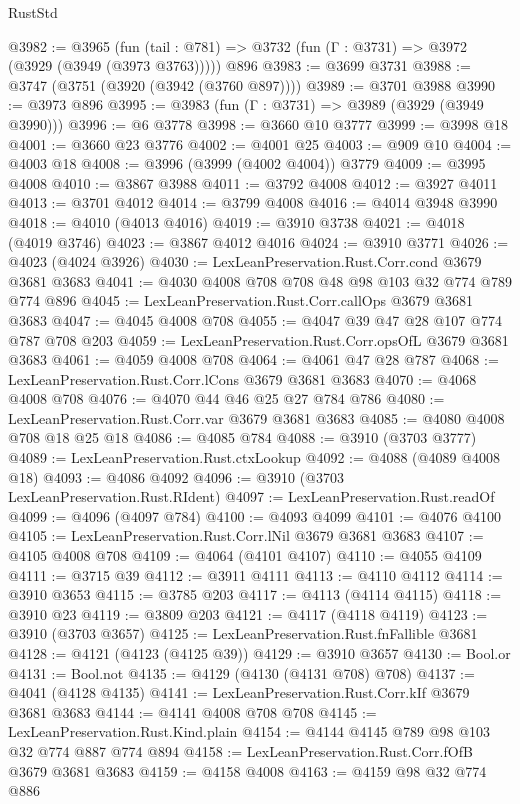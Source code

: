 \begin{lexlean}{RustStd}
\begin{coremodule}
{\begin{coremodule}
{{{{{{{{{{{{{{@3982 := @3965
    (fun (tail : @781) => @3732 (fun (Γ : @3731) => @3972 (@3929 (@3949 (@3973 @3763)))))
    @896
@3983 := @3699 @3731
@3988 := @3747 (@3751 (@3920 (@3942 (@3760 @897))))
@3989 := @3701 @3988
@3990 := @3973 @896
@3995 := @3983 (fun (Γ : @3731) => @3989 (@3929 (@3949 @3990)))
@3996 := @6 @3778
@3998 := @3660 @10 @3777
@3999 := @3998 @18
@4001 := @3660 @23 @3776
@4002 := @4001 @25
@4003 := @909 @10
@4004 := @4003 @18
@4008 := @3996 (@3999 (@4002 @4004)) @3779
@4009 := @3995 @4008
@4010 := @3867 @3988
@4011 := @3792 @4008
@4012 := @3927 @4011
@4013 := @3701 @4012
@4014 := @3799 @4008
@4016 := @4014 @3948 @3990
@4018 := @4010 (@4013 @4016)
@4019 := @3910 @3738
@4021 := @4018 (@4019 @3746)
@4023 := @3867 @4012 @4016
@4024 := @3910 @3771
@4026 := @4023 (@4024 @3926)
@4030 := LexLeanPreservation.Rust.Corr.cond @3679 @3681 @3683
@4041 := @4030 @4008 @708 @708 @48 @98 @103 @32 @774 @789 @774 @896
@4045 := LexLeanPreservation.Rust.Corr.callOps @3679 @3681 @3683
@4047 := @4045 @4008 @708
@4055 := @4047 @39 @47 @28 @107 @774 @787 @708 @203
@4059 := LexLeanPreservation.Rust.Corr.opsOfL @3679 @3681 @3683
@4061 := @4059 @4008 @708
@4064 := @4061 @47 @28 @787
@4068 := LexLeanPreservation.Rust.Corr.lCons @3679 @3681 @3683
@4070 := @4068 @4008 @708
@4076 := @4070 @44 @46 @25 @27 @784 @786
@4080 := LexLeanPreservation.Rust.Corr.var @3679 @3681 @3683
@4085 := @4080 @4008 @708 @18 @25 @18
@4086 := @4085 @784
@4088 := @3910 (@3703 @3777)
@4089 := LexLeanPreservation.Rust.ctxLookup
@4092 := @4088 (@4089 @4008 @18)
@4093 := @4086 @4092
@4096 := @3910 (@3703 LexLeanPreservation.Rust.RIdent)
@4097 := LexLeanPreservation.Rust.readOf
@4099 := @4096 (@4097 @784)
@4100 := @4093 @4099
@4101 := @4076 @4100
@4105 := LexLeanPreservation.Rust.Corr.lNil @3679 @3681 @3683
@4107 := @4105 @4008 @708
@4109 := @4064 (@4101 @4107)
@4110 := @4055 @4109
@4111 := @3715 @39
@4112 := @3911 @4111
@4113 := @4110 @4112
@4114 := @3910 @3653
@4115 := @3785 @203
@4117 := @4113 (@4114 @4115)
@4118 := @3910 @23
@4119 := @3809 @203
@4121 := @4117 (@4118 @4119)
@4123 := @3910 (@3703 @3657)
@4125 := LexLeanPreservation.Rust.fnFallible @3681
@4128 := @4121 (@4123 (@4125 @39))
@4129 := @3910 @3657
@4130 := Bool.or
@4131 := Bool.not
@4135 := @4129 (@4130 (@4131 @708) @708)
@4137 := @4041 (@4128 @4135)
@4141 := LexLeanPreservation.Rust.Corr.kIf @3679 @3681 @3683
@4144 := @4141 @4008 @708 @708
@4145 := LexLeanPreservation.Rust.Kind.plain
@4154 := @4144 @4145 @789 @98 @103 @32 @774 @887 @774 @894
@4158 := LexLeanPreservation.Rust.Corr.fOfB @3679 @3681 @3683
@4159 := @4158 @4008
@4163 := @4159 @98 @32 @774 @886
}}}}}}}}}}}}}}
\end{coremodule}}
\end{coremodule}
\end{lexlean}
